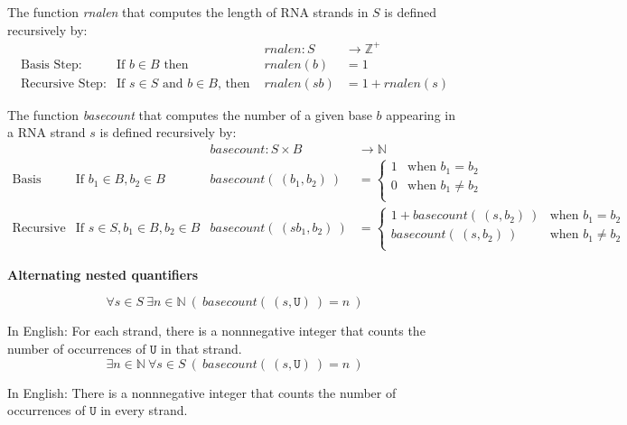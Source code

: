 \documentclass[12pt, oneside]{article}
\newcommand{\U}[0]{\texttt{U}}
\begin{document}
The function \textit{rnalen} that computes the length of RNA strands in $S$ is defined recursively by:
\[
\begin{array}{llll}
& & \textit{rnalen} : S & \to \mathbb{Z}^+ \\
\textrm{Basis Step:} & \textrm{If } b \in B\textrm{ then } & \textit{rnalen}(b) & = 1 \\
\textrm{Recursive Step:} & \textrm{If } s \in S\textrm{ and }b \in B\textrm{, then  } & \textit{rnalen}(sb) & = 1 + \textit{rnalen}(s)
\end{array}
\]

The function \textit{basecount} that computes the number of a given base 
$b$ appearing in a RNA strand $s$ is defined recursively by:
\[
\begin{array}{llll}
& & \textit{basecount} : S \times B & \to \mathbb{N} \\
\textrm{Basis Step:} &  \textrm{If } b_1 \in B, b_2 \in B & \textit{basecount}(~(b_1, b_2)~) & =
        \begin{cases}
            1 & \textrm{when } b_1 = b_2 \\
            0 & \textrm{when } b_1 \neq b_2 \\
        \end{cases} \\
\textrm{Recursive Step:} & \textrm{If } s \in S, b_1 \in B, b_2 \in B &\textit{basecount}(~(s b_1, b_2)~) & =
        \begin{cases}
            1 + \textit{basecount}(~(s, b_2)~) & \textrm{when } b_1 = b_2 \\
            \textit{basecount}(~(s, b_2)~) & \textrm{when } b_1 \neq b_2 \\
        \end{cases}
\end{array}
\] 

{\bf Alternating nested quantifiers}



$$\forall s \in S ~\exists n \in \mathbb{N} ~(~basecount(~(s,\U)~) = n~)$$

In English: For each strand, there is a nonnnegative integer that counts the number of occurrences of $\U$ in that 
strand.\\

$$\exists n \in \mathbb{N} ~\forall s \in S ~(~basecount(~(s,\U)~) = n~)$$

In English: There is a nonnnegative integer that counts the number of occurrences of $\U$ in every 
strand.\\
\end{document}
